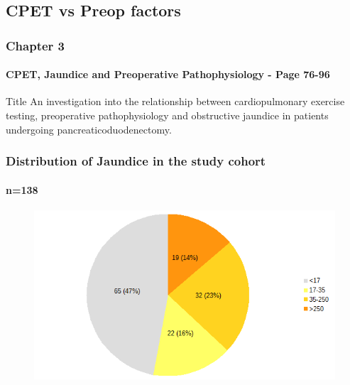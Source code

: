 \documentclass{beamer}
\begin{document}
\subsection{CPET vs Preop factors}

\begin{frame}
	\frametitle{Chapter 3}
	\framesubtitle{CPET, Jaundice and Preoperative Pathophysiology - Page 76-96 }
	\begin{block}{Title}
	An investigation into the relationship between cardiopulmonary exercise testing, preoperative pathophysiology and obstructive jaundice in patients undergoing pancreaticoduodenectomy.
	\end{block}
\end{frame}

\begin{frame}
	\frametitle{Distribution of Jaundice in the study cohort }
	\framesubtitle{n=138}

	\begin{figure}
		\centering
		\includegraphics[width=0.7\linewidth]{jaundice_distribution}
		\caption{}
		\label{fig:jaundice_distribution}
	\end{figure}
\end{frame}
\end{document}
